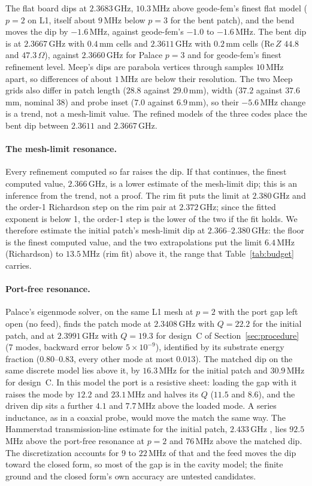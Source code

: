 \documentclass{anvil-paper}
\begin{document}
The flat board dips at $2.3683$\,GHz, $10.3$\,MHz above
geode-fem's finest flat model ($p = 2$ on L1, itself about $9$\,MHz below
$p = 3$ for the bent patch), and the bend moves the dip by $-1.6$\,MHz,
against geode-fem's $-1.0$ to $-1.6$\,MHz. The bent dip is at $2.3667$\,GHz
with $0.4$\,mm cells and $2.3611$\,GHz with $0.2$\,mm cells
($\mathrm{Re}\,Z$ $44.8$ and $47.3\,\Omega$), against $2.3660$\,GHz for Palace
$p = 3$ and for geode-fem's finest refinement level. Meep's dips are parabola vertices
through samples $10$\,MHz apart, so differences of about $1$\,MHz are below
their resolution. The two Meep grids also differ in patch length ($28.8$
against $29.0$\,mm), width ($37.2$ against $37.6$\,mm, nominal $38$) and probe
inset ($7.0$ against $6.9$\,mm), so their $-5.6$\,MHz change is a trend, not a
mesh-limit value. The refined models of the three codes place the bent dip
between $2.3611$ and $2.3667$\,GHz.

\paragraph{The mesh-limit resonance.}
Every refinement computed so far raises the dip. If that continues, the
finest computed value, $2.366$\,GHz, is a lower estimate of the mesh-limit
dip; this is an inference from the trend, not a proof. The rim fit puts the limit at $2.380$\,GHz and the order-1
Richardson step on the rim pair at $2.372$\,GHz; since the fitted exponent
is below 1, the order-1 step is the lower of the two if the fit holds. We
therefore estimate the initial patch's mesh-limit dip at
$2.366$--$2.380$\,GHz: the floor is the finest computed value, and the two
extrapolations put the limit $6.4$\,MHz (Richardson) to $13.5$\,MHz (rim
fit) above it, the range that Table~\ref{tab:budget} carries.

\paragraph{Port-free resonance.}
Palace's eigenmode solver, on the same L1 mesh at $p = 2$ with the port gap
left open (no feed), finds the patch mode at $2.3408$\,GHz with $Q = 22.2$
for the initial patch, and at $2.3991$\,GHz with $Q = 19.3$ for design~C of
Section~\ref{sec:procedure} (7 modes, backward error below $5\times10^{-9}$), identified by its
substrate energy fraction ($0.80$--$0.83$, every other mode at most
$0.013$). The matched dip on the same discrete model lies above it, by
$16.3$\,MHz for the initial patch and $30.9$\,MHz for design~C. In this
model the port is a resistive sheet: loading the gap with it raises the mode
by $12.2$ and $23.1$\,MHz and halves its $Q$ ($11.5$ and $8.6$), and the driven
dip sits a further $4.1$ and $7.7$\,MHz above the loaded mode. A series
inductance, as in a coaxial probe, would move the match the same way.
The Hammerstad transmission-line estimate for the initial patch,
$2.433$\,GHz \citep{hammerstad1975equations}, lies $92.5$\,MHz above the
port-free resonance at $p = 2$ and $76$\,MHz above the matched dip. The
discretization accounts for $9$ to $22$\,MHz of that and the feed moves the
dip toward the closed form, so most of the gap is in the cavity model; the
finite ground and the closed form's own accuracy are untested candidates.
\end{document}
